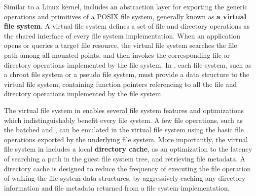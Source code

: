 Similar to a Linux kernel, \thelibos{} includes an abstraction layer for exporting the generic operations and primitives of a POSIX file system,
generally known as {\bf a virtual file system}.
A virtual file system defines a set of file and directory operations as the shared interface of every file system implementation.
When an application opens or queries a target file resource,
the virtual file system
searches the file path among all mounted points,
and then invokes the corresponding file or directory operations implemented by the file system.
In \thelibos{}, each file system, such as a chroot file system
or a pseudo file system,
must provide a data structure to the virtual file system, containing function pointers
referencing to all the file and directory operations  
implemented by the file system.








The virtual file system in \thelibos{} enables several file system features
and optimizations
which indistinguishably benefit every file system.
A few file operations, such as the batched  and ,
can be emulated in the virtual file system
using the basic file operations exported by the underlying file system.
More importantly, 
the virtual file system in \thelibos{} 
includes a local {\bf directory cache},
as an optimization to the latency of searching a path in the guest file system tree,
and retrieving file metadata.
A directory cache
is designed to reduce the frequency
of executing the file operation of walking the file system data structures,
by aggressively caching any directory information
and file metadata
returned from a file system implementation.


